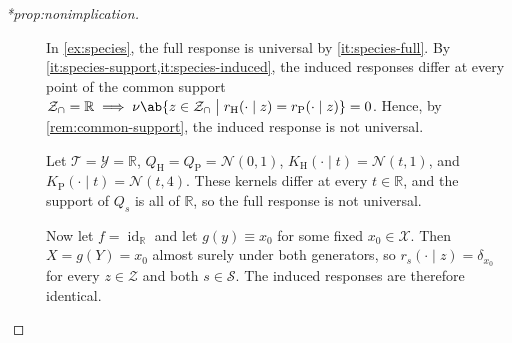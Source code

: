 \documentclass[12pt]{article}
\newcommand{\Herwig}{\mathrm{H}}
\newcommand{\Pythia}{\mathrm{P}}
\newcommand{\Gens}{\mathcal{S}}
\newcommand{\Normal}{\mathcal{N}}
\newcommand{\supp}{\mathcal{Z}_{\cap}}
\newcommand{\1}{\mathbbm{1}}
\renewcommand{\[}{\begin{equation}}
\renewcommand{\]}{\end{equation}}
\begin{document}
\begin{proof}[*prop:nonimplication]
        \begin{description}
            \item[] In \cref{ex:species}, the full response is universal by \cref{it:species-full}. By \cref{it:species-support,it:species-induced}, the induced responses differ at every point of the common support \(\supp=\mathbb R \implies \nu \ab\{z \in \supp \;\big|\; r_\Herwig(\cdot \mid z) = r_\Pythia(\cdot \mid z)\} = 0\). Hence, by \cref{rem:common-support}, the induced response is not universal.
            \item[] Let \(\mathcal T = \mathcal Y = \mathbb R\), \(Q_\Herwig = Q_\Pythia = \Normal(0,1)\), \(K_\Herwig(\cdot\mid t) = \Normal(t,1)\), and \(K_\Pythia( \cdot \mid t) = \Normal(t, 4)\).
                These kernels differ at every \(t\in\mathbb R\), and the support of \(Q_s\) is all of \(\mathbb R\), so the full response is not universal.
                
                Now let \(f = \operatorname{id}_{\mathbb R}\) and let \(g(y) \equiv x_0\) for some fixed \(x_0 \in \mathcal X\).
                Then \(X = g(Y) = x_0\) almost surely under both generators, so \(r_s(\cdot \mid z) = \delta_{x_0}\) for every \(z \in \mathcal Z\) and both \(s \in \Gens\).
                The induced responses are therefore identical.
        \end{description}
    \end{proof}
\end{document}
